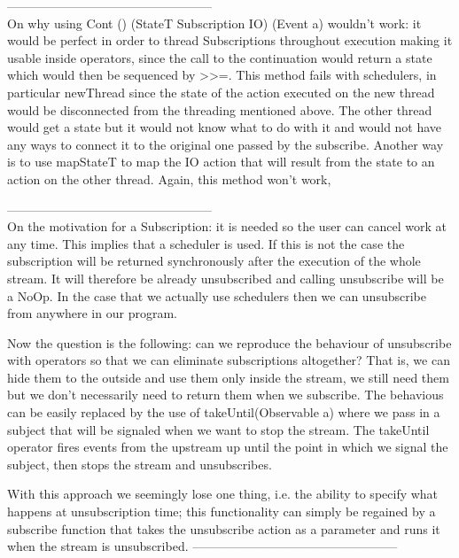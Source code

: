 
--------------------------------------------------\\
On why using Cont () (StateT Subscription IO) (Event a) wouldn't work: it would be perfect in order to thread Subscriptions throughout execution making it usable inside operators, since the call to the continuation would return a state which would then be sequenced by >>=. This method fails with schedulers, in particular newThread since the state of the action executed on the new thread would be disconnected from the threading mentioned above. The other thread would get a state but it would not know what to do with it and would not have any ways to connect it to the original one passed by the subscribe. Another way is to use mapStateT to map the IO action that will result from the state to an action on the other thread. Again, this method won't work, 

--------------------------------------------------\\
On the motivation for a Subscription: it is needed so the user can cancel work at any time. This implies that a scheduler is used. If this is not the case the subscription will be returned synchronously after the execution of the whole stream. It will therefore be already unsubscribed and calling unsubscribe will be a NoOp. In the case that we actually use schedulers then we can unsubscribe from anywhere in our program. 

Now the question is the following: can we reproduce the behaviour of unsubscribe with operators so that we can eliminate subscriptions altogether? That is, we can hide them to the outside and use them only inside the stream, we still need them but we don't necessarily need to return them when we subscribe. The behavious can be easily replaced by the use of takeUntil(Observable a) where we pass in a subject that will be signaled when we want to stop the stream. The takeUntil operator fires events from the upstream up until the point in which we signal the subject, then stops the stream and unsubscribes. 

With this approach we seemingly lose one thing, i.e. the ability to specify what happens at unsubscription time; this functionality can simply be regained by a subscribe function that takes the unsubscribe action as a parameter and runs it when the stream is unsubscribed.
--------------------------------------------------

